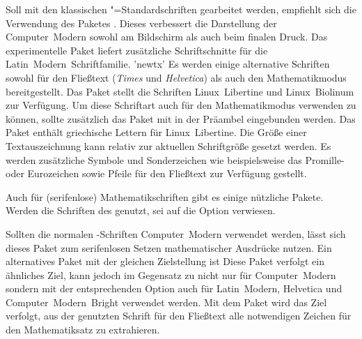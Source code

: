 \begin{DeclarePackages}
  Soll mit den klassischen "=Standardschriften gearbeitet 
  werden, empfiehlt sich die Verwendung des Paketes . Dieses 
  verbessert die Darstellung der Computer~Modern sowohl am Bildschirm als auch 
  beim finalen Druck. Das experimentelle Paket  liefert 
  zusätzliche Schriftschnitte für die Latin~Modern~Schriftfamilie.
'newtx'
  Es werden einige alternative Schriften sowohl für den Fließtext 
  (\textit{Times} und \textit{Helvetica}) als auch den Mathematikmodus 
  bereitgestellt.
  Das Paket stellt die Schriften Linux~Libertine und Linux~Biolinum zur 
  Verfügung. Um diese Schriftart auch für den Mathematikmodus verwenden zu 
  können, sollte zusätzlich das Paket  mit 
   in der 
  Präambel eingebunden werden. Das Paket  enthält griechische 
  Lettern für Linux~Libertine.
  Die Größe einer Textauszeichnung kann relativ zur aktuellen Schriftgröße 
  gesetzt werden.
  Es werden zusätzliche Symbole und Sonderzeichen wie beispielsweise das 
  Promille- oder Eurozeichen sowie Pfeile für den Fließtext zur Verfügung 
  gestellt.
\end{DeclarePackages}

%
Auch für (serifenlose) Mathematikschriften gibt es einige nützliche Pakete. 
Werden die Schriften des \CDs genutzt, sei auf die Option  
verwiesen.

\begin{DeclarePackages}
  Sollten die normalen -Schriften Computer~Modern verwendet 
  werden, lässt sich dieses Paket zum serifenlosen Setzen mathematischer 
  Ausdrücke nutzen. Ein alternatives Paket mit der gleichen Zielstellung ist 
  Diese Paket verfolgt ein ähnliches Ziel, kann jedoch im Gegensatz zu 
   nicht nur für Computer~Modern sondern mit der 
  entsprechenden Option auch für Latin~Modern, Helvetica und 
  Computer~Modern~Bright verwendet werden.
  Mit dem Paket wird das Ziel verfolgt, aus der genutzten Schrift für den 
  Fließtext alle notwendigen Zeichen für den Mathematiksatz zu extrahieren.
\end{DeclarePackages}



